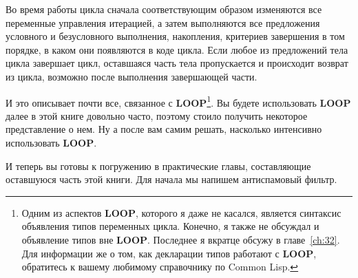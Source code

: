 Во время работы цикла сначала соответствующим образом изменяются все переменные управления
итерацией, а затем выполняются все предложения условного и безусловного выполнения,
накопления, критериев завершения в том порядке, в каком они появляются в коде цикла. Если
любое из предложений тела цикла завершает цикл, оставшаяся часть тела пропускается и
происходит возврат из цикла, возможно после выполнения завершающей части.

И это описывает почти все, связанное с \textbf{LOOP}\footnote{Одним из аспектов
  \textbf{LOOP}, которого я даже не касался, является синтаксис объявления типов
  переменных цикла. Конечно, я также не обсуждал и объявление типов вне
  \textbf{LOOP}. Последнее я вкратце обсужу в главе~\ref{ch:32}. Для информации же о том,
  как декларации типов работают с \textbf{LOOP}, обратитесь к вашему любимому справочнику
  по Common Lisp.}. Вы будете использовать \textbf{LOOP} далее в этой книге довольно
часто, поэтому стоило получить некоторое представление о нем. Ну а после вам самим решать,
насколько интенсивно использовать \textbf{LOOP}.

И теперь вы готовы к погружению в практические главы, составляющие оставшуюся часть этой
книги. Для начала мы напишем антиспамовый фильтр.



